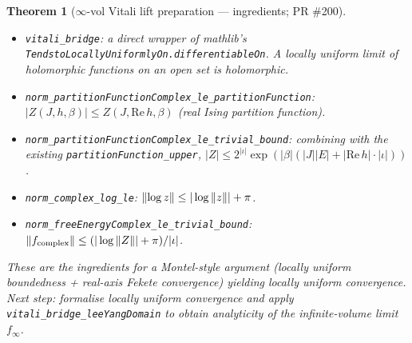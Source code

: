 \documentclass[a4paper,11pt]{article}
\newtheorem{theorem}{Theorem}
\begin{document}
\begin{theorem}[$\infty$-vol Vitali lift preparation --- ingredients; PR \#200]
\begin{itemize}
\item \texttt{vitali\_bridge}: a direct wrapper of mathlib's
  \texttt{TendstoLocallyUniformlyOn.differentiableOn}. A locally
  uniform limit of holomorphic functions on an open set is holomorphic.
\item \texttt{norm\_partitionFunctionComplex\_le\_partitionFunction}:
  $|Z(J, h, \beta)| \le Z(J, \mathrm{Re}\,h, \beta)$ (real Ising
  partition function).
\item \texttt{norm\_partitionFunctionComplex\_le\_trivial\_bound}:
  combining with the existing \texttt{partitionFunction\_upper},
  $|Z| \le 2^{|\iota|} \exp(|\beta|(|J||E| + |\mathrm{Re}\,h| \cdot |\iota|))$.
\item \texttt{norm\_complex\_log\_le}:
  $\|{\rm log}\,z\| \le |\log\|z\|| + \pi$.
\item \texttt{norm\_freeEnergyComplex\_le\_trivial\_bound}:
  $\|f_{\rm complex}\| \le (|\log\|Z\|| + \pi)/|\iota|$.
\end{itemize}
These are the ingredients for a Montel-style argument (locally uniform
boundedness + real-axis Fekete convergence) yielding locally uniform
convergence. Next step: formalise locally uniform convergence and
apply \texttt{vitali\_bridge\_leeYangDomain} to obtain analyticity of
the infinite-volume limit $f_\infty$.
\end{theorem}
\end{document}
